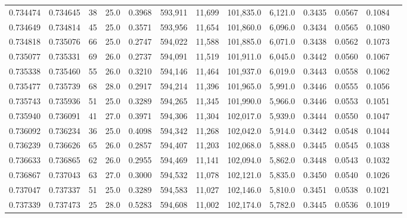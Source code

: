 \begin{tabular}{rrrrrrrrrrrrr}
0.734474 & 0.734645 &    38 & 25.0 &                                     0.3968 & 593,911 &  11,699 & 101,835.0 &   6,121.0 & 0.3435 & 0.0567 & 0.1084 \\
0.734649 & 0.734814 &    45 & 25.0 &                                     0.3571 & 593,956 &  11,654 & 101,860.0 &   6,096.0 & 0.3434 & 0.0565 & 0.1080 \\
0.734818 & 0.735076 &    66 & 25.0 &                                     0.2747 & 594,022 &  11,588 & 101,885.0 &   6,071.0 & 0.3438 & 0.0562 & 0.1073 \\
0.735077 & 0.735331 &    69 & 26.0 &                                     0.2737 & 594,091 &  11,519 & 101,911.0 &   6,045.0 & 0.3442 & 0.0560 & 0.1067 \\
0.735338 & 0.735460 &    55 & 26.0 &                                     0.3210 & 594,146 &  11,464 & 101,937.0 &   6,019.0 & 0.3443 & 0.0558 & 0.1062 \\
0.735477 & 0.735739 &    68 & 28.0 &                                     0.2917 & 594,214 &  11,396 & 101,965.0 &   5,991.0 & 0.3446 & 0.0555 & 0.1056 \\
0.735743 & 0.735936 &    51 & 25.0 &                                     0.3289 & 594,265 &  11,345 & 101,990.0 &   5,966.0 & 0.3446 & 0.0553 & 0.1051 \\
0.735940 & 0.736091 &    41 & 27.0 &                                     0.3971 & 594,306 &  11,304 & 102,017.0 &   5,939.0 & 0.3444 & 0.0550 & 0.1047 \\
0.736092 & 0.736234 &    36 & 25.0 &                                     0.4098 & 594,342 &  11,268 & 102,042.0 &   5,914.0 & 0.3442 & 0.0548 & 0.1044 \\
0.736239 & 0.736626 &    65 & 26.0 &                                     0.2857 & 594,407 &  11,203 & 102,068.0 &   5,888.0 & 0.3445 & 0.0545 & 0.1038 \\
0.736633 & 0.736865 &    62 & 26.0 &                                     0.2955 & 594,469 &  11,141 & 102,094.0 &   5,862.0 & 0.3448 & 0.0543 & 0.1032 \\
0.736867 & 0.737043 &    63 & 27.0 &                                     0.3000 & 594,532 &  11,078 & 102,121.0 &   5,835.0 & 0.3450 & 0.0540 & 0.1026 \\
0.737047 & 0.737337 &    51 & 25.0 &                                     0.3289 & 594,583 &  11,027 & 102,146.0 &   5,810.0 & 0.3451 & 0.0538 & 0.1021 \\
0.737339 & 0.737473 &    25 & 28.0 &                                     0.5283 & 594,608 &  11,002 & 102,174.0 &   5,782.0 & 0.3445 & 0.0536 & 0.1019 \\

\end{tabular}
